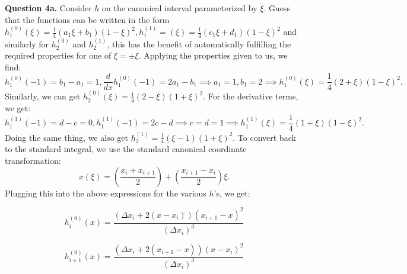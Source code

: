 \documentclass[letterpaper, reqno,11pt]{article}
\begin{document}


{\medskip\noindent\bf Question 4a.} Consider $h$ on the canonical interval parameterized by $\xi$. Guess that the functions can be written in the form $h_1^{(0)}(\xi)=\frac{1}{4}(a_1\xi+b_1)(1-\xi)^2, h_1^{(1)}=(\xi)=\frac{1}{4}(c_1\xi+d_1)(1-\xi)^2$ and similarly for $h_2^{(0)}$ and $h_2^{(1)}$, this has the benefit of automatically fulfilling the required properties for one of $\xi=\pm\xi$. Applying the properties given to us, we find:
\[
h_1^{(0)}(-1)=b_1-a_1=1, \frac{d}{dx}h_1^{(0)}(-1)=2a_1-b_1\implies a_1=1, b_1=2\implies h_1^{(0)}(\xi)=\frac{1}{4}(2+\xi)(1-\xi)^2
.\]
Similarly, we can get $h_2^{(0)}(\xi)=\frac{1}{4}(2-\xi)(1+\xi)^2$. For the derivative terms, we get:
\[
h_1^{(1)}(-1)=d-c=0, h_1^{(1)}(-1)=2c-d\implies c=d=1\implies h_1^{(1)}(\xi)=\frac{1}{4}(1+\xi)(1-\xi)^2
.\]
Doing the same thing, we also get $h_2^{(1)}=\frac{1}{4}(\xi-1)(1+\xi)^2$. To convert back to the standard integral, we use the standard canonical coordinate transformation:
\[
    x(\xi)=\left( \frac{x_i+x_{i+1}}{2} \right) +\left( \frac{x_{i+1}-x_i}{2} \right) \xi
.\]
Plugging this into the above expressions for the various $h$'s, we get:

\begin{equation}
h_{i}^{(0)}(x) = \frac{\left(\Delta x_{i} + 2(x - x_{i})\right)(x_{i+1} - x)^{2}}{(\Delta x_{i})^{3}} 
\end{equation}

\begin{equation}
h_{i+1}^{(0)}(x) = \frac{\left(\Delta x_{i} + 2(x_{i+1} - x)\right)(x - x_{i})^{2}}{(\Delta x_{i})^{3}}
\end{equation}
\end{document}
